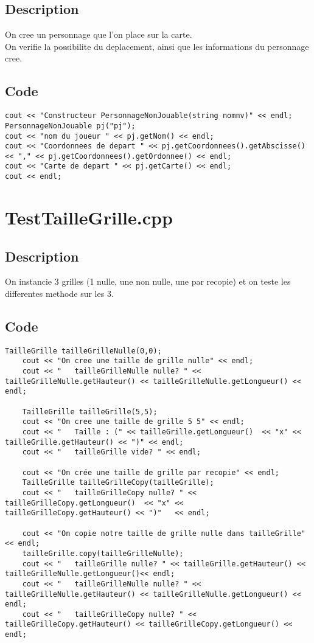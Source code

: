         \subsection{Description}
            On cree un personnage que l'on place sur la carte.\\
            On verifie la possibilite du deplacement, ainsi que les informations du personnage cree.
        \subsection{Code}
\begin{lstlisting}	
cout << "Constructeur PersonnageNonJouable(string nomnv)" << endl;
PersonnageNonJouable pj("pj");
cout << "nom du joueur " << pj.getNom() << endl;
cout << "Coordonnees de depart " << pj.getCoordonnees().getAbscisse() << "," << pj.getCoordonnees().getOrdonnee() << endl;
cout << "Carte de depart " << pj.getCarte() << endl;
cout << endl;
	\end{lstlisting}
    \section{TestTailleGrille.cpp}
        \subsection{Description}
            On instancie 3 grilles (1 nulle, une non nulle, une par recopie) et on teste les differentes methode sur les 3.
        \subsection{Code}
\begin{lstlisting}
TailleGrille tailleGrilleNulle(0,0);
    cout << "On cree une taille de grille nulle" << endl;
    cout << "   tailleGrilleNulle nulle? " << tailleGrilleNulle.getHauteur() << tailleGrilleNulle.getLongueur() << endl;

    TailleGrille tailleGrille(5,5);
    cout << "On cree une taille de grille 5 5" << endl;
    cout << "   Taille : (" << tailleGrille.getLongueur()  << "x" << tailleGrille.getHauteur() << ")" << endl;
    cout << "   tailleGrille vide? " << endl;

    cout << "On crée une taille de grille par recopie" << endl;
    TailleGrille tailleGrilleCopy(tailleGrille);
    cout << "   tailleGrilleCopy nulle? " << tailleGrilleCopy.getLongueur()  << "x" << tailleGrilleCopy.getHauteur() << ")"   << endl;

    cout << "On copie notre taille de grille nulle dans tailleGrille" << endl;
    tailleGrille.copy(tailleGrilleNulle);
    cout << "   tailleGrille nulle? " << tailleGrille.getHauteur() << tailleGrilleNulle.getLongueur()<< endl;
    cout << "   tailleGrilleNulle nulle? " << tailleGrilleNulle.getHauteur() << tailleGrilleNulle.getLongueur() << endl;
    cout << "   tailleGrilleCopy nulle? " << tailleGrilleCopy.getHauteur() << tailleGrilleCopy.getLongueur() << endl;
	\end{lstlisting}

